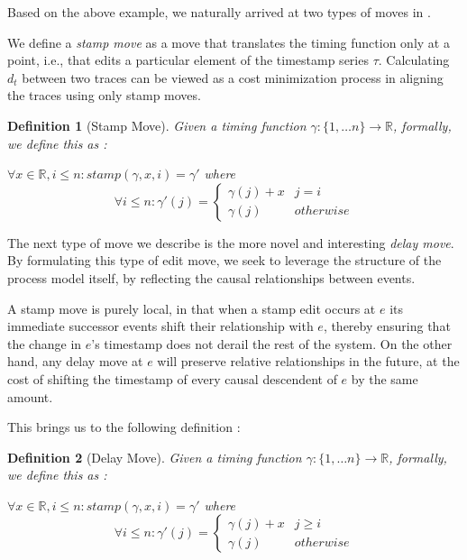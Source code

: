 \documentclass[conference]{IEEEtran}
\newcounter{cases}
\newtheorem{definition}{Definition}
\begin{document}
	Based on the above example, we naturally arrived at two types of moves in \cite{CR22}.  
	
	We define a \textit{stamp move} as a move that translates the timing function only at a point, i.e., that edits a particular element of the timestamp series $\tau$. 
	Calculating $d_t$ between two traces can be viewed as a cost minimization process in aligning the traces using only stamp moves. 
	
	\begin{definition}[Stamp Move]
		Given a timing function $\gamma : \{1, \dots n\} \to \mathbb{R}$, formally, we define this as : 
		
		$\forall x \in \mathbb{R}, i \leq n : stamp(\gamma, x, i) =\gamma' $ where
		$$\forall i \leq n : \gamma'(j)  = \begin{cases}
			\gamma(j) + x & j = i \\
			\gamma(j)& otherwise
		\end{cases}$$
		
	\end{definition}
	
	The next type of move we describe is the more novel and interesting \textit{delay move}. 
	By formulating this type of edit move, we seek to leverage the structure of the process model itself, by reflecting the causal relationships between events. 
	
	A stamp move is purely local, in that when a stamp edit occurs at $e$ its immediate successor events shift their relationship with $e$, thereby ensuring that the change in $e$'s timestamp does not derail the rest of the system. 
	On the other hand, any delay move at $e$ will preserve relative relationships in the future, at the cost of shifting the timestamp of every causal descendent of $e$ by the same amount. 
	
	This brings us to the following definition : 
	
	\begin{definition}[Delay Move]
		Given a timing function $\gamma : \{1, \dots n\} \to \mathbb{R}$, formally, we define this as : 
		
		$\forall x \in \mathbb{R}, i \leq n : stamp(\gamma, x, i) =\gamma' $ where
		$$\forall i \leq n : \gamma'(j)  = \begin{cases}
			\gamma(j) + x & j \geq  i \\
			\gamma(j)& otherwise
		\end{cases}$$
		
	\end{definition}
	
\end{document}
